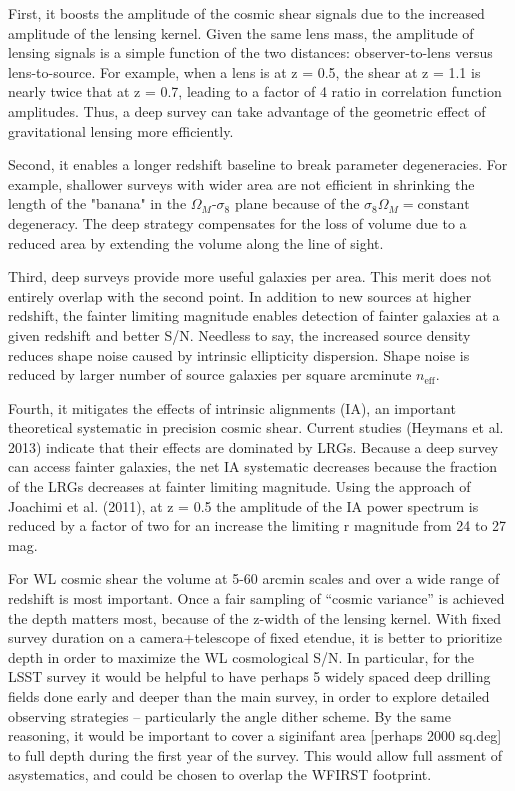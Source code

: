 First, it boosts the amplitude of the cosmic shear signals due to the increased
amplitude of the lensing kernel.  Given the same lens mass, the amplitude of
lensing signals is a simple function of the two distances: observer-to-lens
versus lens-to-source. For example, when a lens is at z = 0.5, the shear at z =
1.1 is nearly twice that at z = 0.7, leading to a factor of 4 ratio in
correlation function amplitudes.  Thus, a deep survey can take advantage of the
geometric effect of gravitational lensing more efficiently.

Second, it enables a longer redshift baseline to break parameter degeneracies.
For example, shallower surveys with wider area are not efficient in shrinking
the length of the "banana" in the $\Omega_M$-$\sigma_8$ plane because of the $\sigma_8 \Omega_M = \mathrm{constant}$
degeneracy.  The deep strategy compensates for the loss of
volume due to a reduced area by extending the volume along the line of sight.

Third, deep surveys provide more useful galaxies per area.  This merit does not
entirely overlap with the second point.  In addition to new sources at higher
redshift, the fainter limiting magnitude enables detection of fainter galaxies
at a given redshift and better S/N.  Needless to say, the increased source
density reduces shape noise caused by intrinsic ellipticity dispersion.  Shape
noise is reduced by larger number of source galaxies per square arcminute
$n_\mathrm{eff}$.

Fourth, it mitigates the effects of intrinsic alignments (IA), an important
theoretical systematic in precision cosmic
shear.  Current studies (Heymans et al. 2013) indicate that their effects are
dominated by LRGs.  Because a deep survey can access fainter galaxies, the net IA
systematic decreases because the fraction of the LRGs decreases at fainter
limiting magnitude. Using the approach of Joachimi et al. (2011),  at z = 0.5
the amplitude of the IA power spectrum is reduced by a factor of two for an
increase the limiting r magnitude from 24 to 27 mag.

For WL cosmic shear the volume at 5-60 arcmin scales and over a wide range of
redshift is most important. Once a fair sampling of “cosmic variance” is
achieved the depth matters most, because of the z-width of the lensing kernel.
With fixed survey duration on a camera+telescope of fixed etendue, it is better
to prioritize depth in order to maximize the WL cosmological S/N.  In
particular, for the LSST survey it would be helpful to have perhaps 5 widely
spaced deep drilling fields done early and deeper than the main survey, in order
to explore detailed observing strategies -- particularly the angle dither
scheme.  By the same reasoning, it would be important to cover  a siginifant
area [perhaps 2000 sq.deg] to full depth during the first year of the survey.
This would allow full assment of asystematics, and could be chosen to overlap
the WFIRST footprint.




